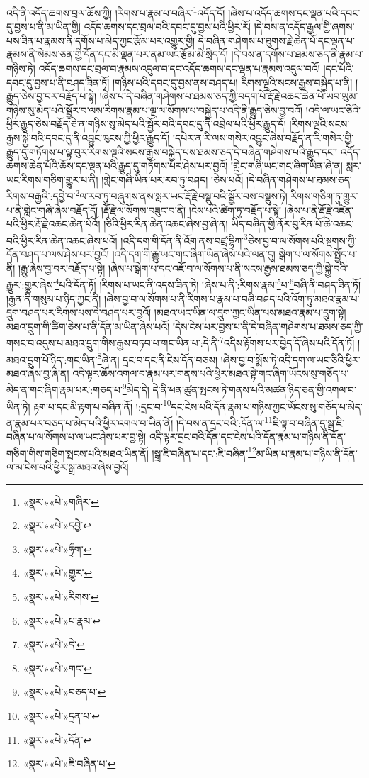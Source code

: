 འདི་ནི་འདོད་ཆགས་བྲལ་ཆོས་ཀྱི། །རིགས་པ་རྣམ་པ་བཞིར་\footnote{«སྣར་»«པེ་»གཞིར་}འདོད་དོ། །ཞེས་པ་འདོད་ཆགས་དང་ལྡན་པའི་དབང་དུ་བྱས་པ་ནི་མ་ཡིན་གྱི། འདོད་ཆགས་དང་བྲལ་བའི་དབང་དུ་བྱས་པའི་ཕྱིར་རོ། །དེ་བས་ན་འདོད་རྒྱལ་གྱི་ཞགས་པས་ཟིན་པ་རྣམས་ནི་དགོས་པ་མེད་ཀྱང་རྩོམ་པར་འགྱུར་གྱི། དེ་བཞིན་གཤེགས་པ་ཐུགས་རྗེ་ཆེན་པོ་དང་ལྡན་པ་རྣམས་ནི་སེམས་ཅན་གྱི་དོན་དང་མི་ལྡན་པར་ནམ་ཡང་རྩོམ་མི་སྲིད་དོ། །དེ་བས་ན་དགོས་པ་ཐམས་ཅད་ནི་རྣམ་པ་གཉིས་ཏེ། འདོད་ཆགས་དང་བྲལ་བ་རྣམས་འདུལ་བ་དང་འདོད་ཆགས་དང་ལྡན་པ་རྣམས་འདུལ་བའོ། །དང་པོའི་དབང་དུ་བྱས་པ་ནི་བཤད་ཟིན་ཏོ། །གཉིས་པའི་དབང་དུ་བྱས་ནས་བཤད་པ། རིགས་ལྔའི་སངས་རྒྱས་བསྐྱེད་པ་ནི། །རྒྱུད་ཅེས་བྱ་བར་བརྗོད་པ་སྟེ། །ཞེས་པ་དེ་བཞིན་གཤེགས་པ་ཐམས་ཅད་ཀྱི་བདག་པོ་རྡོ་རྗེ་འཆང་ཆེན་པོ་ཡབ་ཡུམ་གཉིས་སུ་མེད་པའི་སྦྱོར་བ་ལས་རིགས་རྣམ་པ་ལྔ་ལ་སོགས་པ་བསྐྱེད་པ་འདི་ནི་རྒྱུད་ཅེས་བྱ་བའོ། །འདི་ལ་ཡང་ཅིའི་ཕྱིར་རྒྱུད་ཅེས་བརྗོད་ཅེ་ན་གཉིས་སུ་མེད་པའི་སྦྱོར་བའི་དབང་དུ་ནི་འབྲེལ་པའི་ཕྱིར་རྒྱུད་དོ། །རིགས་ལྔའི་སངས་རྒྱས་སྐྱེ་བའི་དབང་དུ་ནི་འབྱུང་ཁུངས་ཀྱི་ཕྱིར་རྒྱུད་དོ། །དཔེར་ན་རི་ལས་གསེར་འབྱུང་ཞེས་བརྗོད་ན་རི་གསེར་གྱི་རྒྱུད་དུ་གཏོགས་པ་ལྟ་བུར་རིགས་ལྔའི་སངས་རྒྱས་བསྐྱེད་པས་ཐམས་ཅད་དེ་བཞིན་གཤེགས་པའི་རྒྱུད་དང་། འདོད་ཆགས་ཆེན་པོའི་ཆོས་དང་ལྡན་པའི་རྒྱུད་དུ་གཏོགས་པར་ཤེས་པར་བྱའོ། །གླེང་གཞི་ཡང་གང་ཞིག་ཡིན་ཞེ་ན། སླར་ཡང་རིགས་གཅིག་གྱུར་པ་ནི། །གླེང་གཞི་ཡིན་པར་རབ་ཏུ་བཤད། །ཅེས་པའོ། །དེ་བཞིན་གཤེགས་པ་ཐམས་ཅད་རིགས་བརྒྱའི་:དབྱེ་བ་\footnote{«སྣར་»«པེ་»དབྱེ་}ལ་རབ་ཏུ་བཞུགས་ནས་སླར་ཡང་རྡོ་རྗེ་བསྡུ་བའི་སྦྱོར་བས་བསྡུས་ཏེ། རིགས་གཅིག་ཏུ་གྱུར་པ་ནི་གླེང་གཞི་ཞེས་བརྗོད་དོ། །རྡོ་རྗེ་ལ་སོགས་བཟུང་བ་ནི། །ངེས་པའི་ཚིག་ཏུ་བརྗོད་པ་སྟེ། །ཞེས་པ་ནི་རྡོ་རྗེ་འཛིན་པའི་ཕྱིར་རྡོ་རྗེ་འཆང་ཆེན་པོའོ། །ཅིའི་ཕྱིར་རིན་ཆེན་འཆང་ཞེས་བྱ་ཞེ་ན། ཡིད་བཞིན་གྱི་ནོར་བུ་རིན་པོ་ཆེ་འཆང་བའི་ཕྱིར་རིན་ཆེན་འཆང་ཞེས་པའོ། །འདི་དག་གི་དོན་ནི་འོག་ནས་བཛྲ་དྷྲིཀ་\footnote{«སྣར་»«པེ་»ཧྲྀག་}ཅེས་བྱ་བ་ལ་སོགས་པའི་སྔགས་ཀྱི་དོན་བཤད་པ་ལས་ཤེས་པར་བྱའོ། །འདི་དག་གི་རྒྱུ་ཡང་གང་ཞིག་ཡིན་ཞེས་པའི་ལན་དུ། སྒེག་པ་ལ་སོགས་སྤྱོད་པ་ནི། །རྒྱུ་ཞེས་བྱ་བར་བརྗོད་པ་སྟེ། །ཞེས་པ་སྒེག་པ་དང་འཇོ་བ་ལ་སོགས་པ་ནི་སངས་རྒྱས་ཐམས་ཅད་ཀྱི་སྐྱེ་བའི་རྒྱུར་:གྱུར་ཞེས་\footnote{«སྣར་»«པེ་»གྱུར་}པའི་དོན་ཏོ། །རིགས་པ་ཡང་ནི་འདས་ཟིན་ཏེ། །ཞེས་པ་ནི་:རིགས་རྣམ་\footnote{«སྣར་»«པེ་»རིགས་}པ་\footnote{«སྣར་»«པེ་»པ་རྣམ་}བཞི་ནི་བཤད་ཟིན་ཏོ། །རྒྱན་ནི་གསུམ་པ་ཉིད་ཀྱང་ནི། །ཞེས་བྱ་བ་ལ་སོགས་པ་ནི་རིགས་པ་རྣམ་པ་བཞི་བཤད་པའི་འོག་ཏུ་མཐའ་རྣམ་པ་དྲུག་བཤད་པར་རིགས་པས་དེ་བཤད་པར་བྱའོ། །མཐའ་ཡང་ཡིན་ལ་དྲུག་ཀྱང་ཡིན་པས་མཐའ་རྣམ་པ་དྲུག་སྟེ། མཐའ་དྲུག་གི་ཚིག་ཅེས་པ་ནི་དོན་མ་ཡིན་ཞེས་པའོ། །དེས་ངེས་པར་བྱས་པ་ནི་དེ་བཞིན་གཤེགས་པ་ཐམས་ཅད་ཀྱི་གསང་བ་འདུས་པ་མཐའ་དྲུག་གིས་རྒྱས་བཏབ་པ་གང་ཡིན་པ་:དེ་ནི་\footnote{«སྣར་»«པེ་»དེ་}འདིས་རྟོགས་པར་བྱེད་དོ་ཞེས་པའི་དོན་ཏོ། །མཐའ་དྲུག་པོ་ཉིད་:གང་ཡིན་\footnote{«སྣར་»«པེ་»གང་}ཞེ་ན། དྲང་བ་དང་ནི་ངེས་དོན་བཅས། །ཞེས་བྱ་བ་སྨོས་ཏེ་འདི་དག་ལ་ཡང་ཅིའི་ཕྱིར་མཐའ་ཞེས་བྱ་ཞེ་ན། འདི་ལྟར་ཆོས་འགལ་བ་རྣམ་པར་གནས་པའི་ཕྱིར་མཐའ་སྟེ་གང་ཞིག་ཡོངས་སུ་གཅོད་པ་མེད་ན་གང་ཞིག་རྣམ་པར་:གཅད་པ་\footnote{«སྣར་»«པེ་»བཅད་པ་}མེད་དེ། དེ་ནི་ཕན་ཚུན་སྤངས་ཏེ་གནས་པའི་མཚན་ཉིད་ཅན་གྱི་འགལ་བ་ཡིན་ཏེ། རྟག་པ་དང་མི་རྟག་པ་བཞིན་ནོ། །:དྲང་བ་\footnote{«སྣར་»«པེ་»དྲན་པ་}དང་ངེས་པའི་དོན་རྣམ་པ་གཉིས་ཀྱང་ཡོངས་སུ་གཅོད་པ་མེད་ན་རྣམ་པར་བཅད་པ་མེད་པའི་ཕྱིར་འགལ་བ་ཡིན་ནོ། །དེ་བས་ན་དྲང་བའི་:དོན་ལ་\footnote{«སྣར་»«པེ་»དོན་}ཇི་ལྟ་བ་བཞིན་དུ་སྒྲ་ཇི་བཞིན་པ་ལ་སོགས་པ་ལ་ཡང་ཤེས་པར་བྱ་སྟེ། འདི་ལྟར་དྲང་བའི་དོན་དང་ངེས་པའི་དོན་རྣམ་པ་གཉིས་ནི་དོན་གཅིག་གིས་གཅིག་སྤངས་པའི་མཐའ་ཡིན་ནོ། །སྒྲ་ཇི་བཞིན་པ་དང་:ཇི་བཞིན་\footnote{«སྣར་»«པེ་»ཇི་བཞིན་པ་}མ་ཡིན་པ་རྣམ་པ་གཉིས་ནི་དོན་ལ་མ་ངེས་པའི་ཕྱིར་སྒྲ་མཐའ་ཞེས་བྱའོ། 
